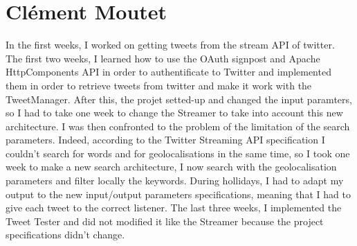 \section{Cl\'{e}ment Moutet}

In the first weeks, I worked on getting tweets from the stream API of twitter. The first two weeks, I learned how to use the OAuth signpost and Apache HttpComponents API in order to authentificate to Twitter and implemented them in order to retrieve tweets from twitter and make it work with the TweetManager. 
After this, the projet setted-up and changed the input paramters, so I had to take one week to change the Streamer to take into account this new architecture.
I was then confronted to the problem of the limitation of the search parameters. Indeed, according to the Twitter Streaming API specification I couldn't search for words and for geolocalisations in the same time, so I took one week to make a new search architecture, I now search with the geolocalisation parameters and filter locally the keywords. During hollidays, I had to adapt my output to the new input/output parameters specifications, meaning that I had to give each tweet to the correct listener.
The last three weeks, I implemented the Tweet Tester and did not modified it like the Streamer because the project specifications didn't change.
